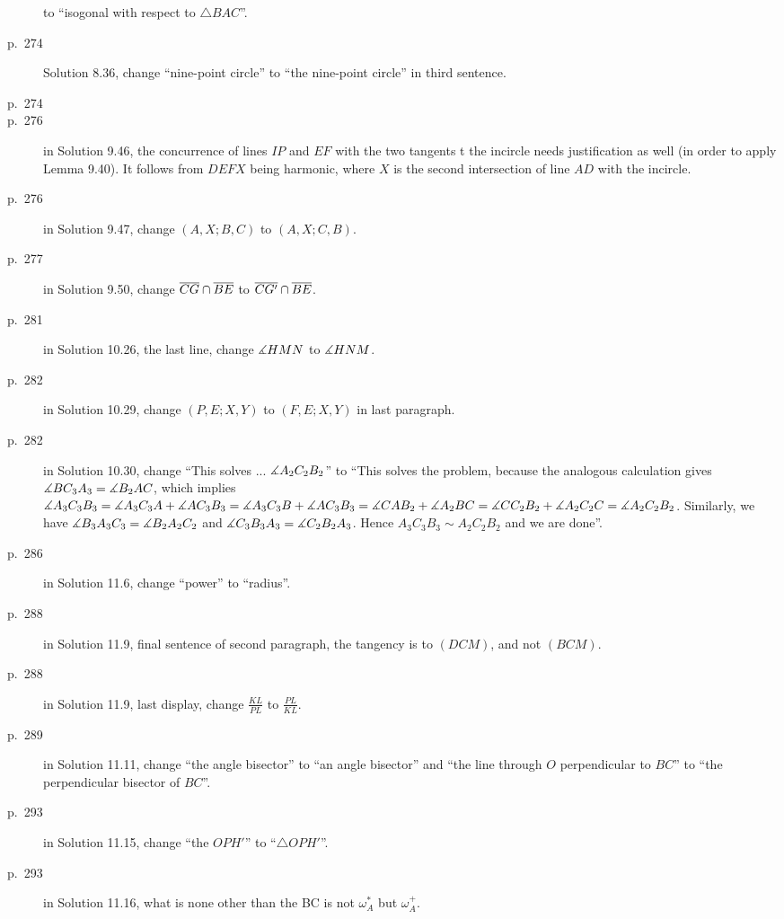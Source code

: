 \documentclass[11pt]{scrartcl}
\begin{document}
\begin{description}
  to ``isogonal with respect to $\triangle{BAC}$''.
\item[p.\  274] Solution 8.36, change ``nine-point circle''
  to ``the nine-point circle'' in third sentence.
\item[p.\  274] 
\item[p.\  276] in Solution 9.46, the concurrence of lines $IP$ and $EF$
  with the two tangents t the incircle needs justification as well
  (in order to apply Lemma 9.40). It follows from $DEFX$ being harmonic,
  where $X$ is the second intersection of line $AD$ with the incircle.
\item[p.\  276] in Solution 9.47, change $(A,X;B,C)$ to $(A,X;C,B)$.
\item[p.\  277] in Solution 9.50, change $\overline{CG} \cap \overline{BE}$ to $\overline{CG'} \cap \overline{BE}$.
\item[p.\  281] in Solution 10.26, the last line, change $\measuredangle HMN$ to $\measuredangle HNM$.
\item[p.\  282] in Solution 10.29, change $(P,E;X,Y)$ to $(F,E;X,Y)$ in last paragraph.
\item[p.\  282] in Solution 10.30, change ``This solves ... $\measuredangle A_2C_2B_2$'' to
  ``This solves the problem, because the analogous calculation gives $\measuredangle BC_3A_3 = \measuredangle B_2AC$,
  which implies $\measuredangle A_3C_3B_3 = \measuredangle A_3C_3A + \measuredangle AC_3B_3 = \measuredangle A_3C_3B + \measuredangle AC_3B_3
  = \measuredangle CAB_2 + \measuredangle A_2BC = \measuredangle CC_2B_2 + \measuredangle A_2C_2C = \measuredangle A_2C_2B_2$.
  Similarly, we have $\measuredangle B_3A_3C_3 = \measuredangle B_2A_2C_2$ and $\measuredangle C_3B_3A_3 = \measuredangle C_2B_2A_3$.
  Hence $A_3C_3B_3 \sim A_2C_2B_2$ and we are done''.
\item[p.\  286] in Solution 11.6, change ``power'' to ``radius''.
\item[p.\  288] in Solution 11.9, final sentence of second paragraph,
  the tangency is to $(DCM)$, and not $(BCM)$.
\item[p.\  288] in Solution 11.9, last display, change $\frac{KL}{PL}$ to $\frac{PL}{KL}$.
\item[p.\  289] in Solution 11.11, change ``the angle bisector'' to ``an angle bisector''
  and ``the line through $O$ perpendicular to $BC$'' to ``the perpendicular bisector of $BC$''.
\item[p.\  293] in Solution 11.15, change ``the $OPH'$'' to ``$\triangle{OPH'}$''.
\item[p.\  293] in Solution 11.16, what is none other than the BC is not $\omega_A^\ast$ but $\omega_A^+$.

\end{description}
\end{document}
